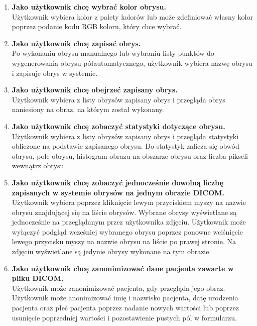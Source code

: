 \documentclass[a4paper,11pt,twoside,openright]{report}
\theoremstyle{definition}
\begin{document}
\begin{enumerate}
\item \textbf {Jako użytkownik chcę wybrać kolor obrysu.} \\
Użytkownik wybiera kolor z palety kolorów lub może zdefiniować własny kolor poprzez
podanie kodu RGB koloru, który chce wybrać.

\item \textbf {Jako użytkownik chcę zapisać obrys.} \\
Po wykonaniu obrysu manualnego lub wybraniu listy punktów do wygenerowania obrysu
półautomatycznego, użytkownik wybiera nazwę obrysu i zapisuje obrys w systemie.

\item \textbf {Jako użytkownik chcę obejrzeć zapisany obrys.} \\
Użytkownik wybiera z listy obrysów zapisany obrys i przegląda obrys naniesiony
na obraz, na którym został wykonany.

\item \textbf {Jako użytkownik chcę zobaczyć statystyki dotyczące obrysu.} \\
Użytkownik wybiera z listy obrysów zapisany obrys i przegląda statystyki obliczone
na podstawie zapisanego obrysu. Do statystyk zalicza się obwód obrysu, pole obrysu,
histogram obrazu na obszarze obrysu oraz liczba pikseli wewnątrz obrysu.

\item \textbf {Jako użytkownik chcę zobaczyć jednocześnie dowolną liczbę zapisanych
w systemie obrysów na jednym obrazie DICOM.} \\
Użytkownik wybiera poprzez kliknięcie lewym przyciskiem myszy na nazwie obrysu
znajdującej się na liście obrysów. Wybrane obrysy wyświetlane są jednocześnie
na przeglądanym przez użytkownika zdjęciu. Użytkownik może wyłączyć podgląd
wcześniej wybranego obrysu poprzez ponowne wciśnięcie lewego przycisku myszy
na nazwie obrysu na liście po prawej stronie. Na zdjęciu wyświetlane są jedynie
obrysy wykonane na tym obrazie.

\item \textbf {Jako użytkownik chcę zanonimizować dane pacjenta zawarte w pliku DICOM.} \\
Użytkownik może zanonimizować pacjenta, gdy przegląda jego obraz. Użytkownik może
anonimizować imię i nazwisko pacjenta, datę urodzenia pacjenta oraz płeć pacjenta
poprzez nadanie nowych wartości lub poprzez usunięcie poprzedniej wartości i
pozostawienie pustych pól w formularzu.

\end{enumerate}
\end{document}
